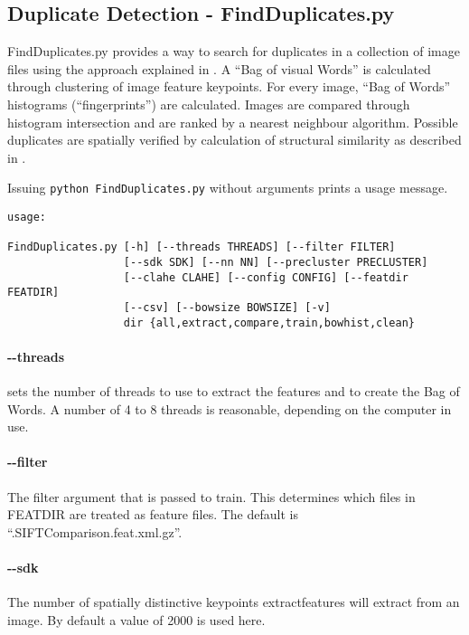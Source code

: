 \subsection{Duplicate Detection - \ttfamily FindDuplicates.py}

FindDuplicates.py provides a way to search for duplicates in a collection of
image files using the approach explained in \cite{ait1}. A ``Bag of visual Words'' 
is calculated through clustering of image feature keypoints. For 
every image, ``Bag of Words'' histograms (``fingerprints'') are calculated. Images are
compared through histogram intersection and are ranked by a nearest neighbour algorithm. 
Possible duplicates are spatially verified by
calculation of structural similarity as described in \cite{ssim}.


Issuing \verb+python FindDuplicates.py+ without arguments prints a usage message.
\clearpage
\begin{verbatim}
usage: 

FindDuplicates.py [-h] [--threads THREADS] [--filter FILTER]
                  [--sdk SDK] [--nn NN] [--precluster PRECLUSTER]
                  [--clahe CLAHE] [--config CONFIG] [--featdir FEATDIR]
                  [--csv] [--bowsize BOWSIZE] [-v]
                  dir {all,extract,compare,train,bowhist,clean}
\end{verbatim}

\paragraph{\ttfamily-{}-threads} 

sets the number of threads to use to extract the features and to create the Bag
of Words. A number of 4 to 8 threads is reasonable, depending on the computer in use.

\paragraph{\ttfamily-{}-filter}

The filter argument that is passed to {\ttfamily train}. This determines which files in
FEATDIR are treated as feature files. The default is ``.SIFTComparison.feat.xml.gz''.

\paragraph{\ttfamily-{}-sdk}

The number of spatially distinctive keypoints {\ttfamily extractfeatures} will extract from
an image. By default a value of 2000 is used here.

